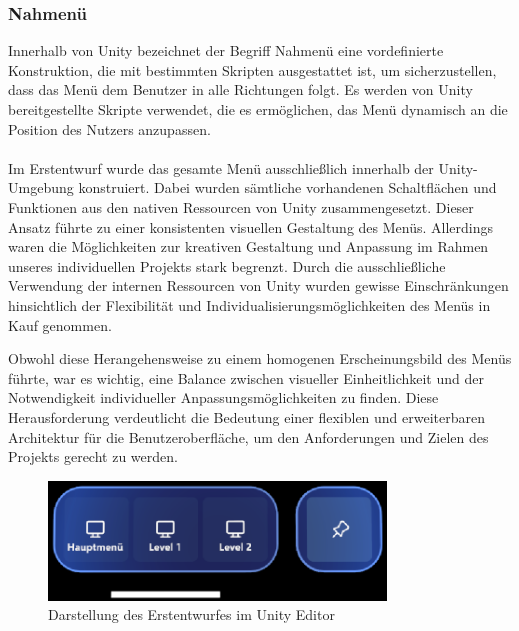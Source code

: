 \subsubsection*{Nahmenü}
Innerhalb von Unity bezeichnet der Begriff Nahmenü eine vordefinierte Konstruktion, die mit bestimmten Skripten
ausgestattet ist, um sicherzustellen, dass das Menü dem Benutzer in alle Richtungen folgt. Es werden von Unity
bereitgestellte Skripte verwendet, die es ermöglichen, das Menü dynamisch an die Position des Nutzers anzupassen.\\
\\
Im Erstentwurf wurde das gesamte Menü ausschließlich innerhalb der Unity-Umgebung konstruiert. Dabei wurden sämtliche
vorhandenen Schaltflächen und Funktionen aus den nativen Ressourcen von Unity zusammengesetzt. Dieser Ansatz führte zu
einer konsistenten visuellen Gestaltung des Menüs. Allerdings waren die Möglichkeiten zur kreativen Gestaltung und
Anpassung im Rahmen unseres individuellen Projekts stark begrenzt. Durch die ausschließliche Verwendung der internen
Ressourcen von Unity wurden gewisse Einschränkungen hinsichtlich der Flexibilität und Individualisierungsmöglichkeiten
des Menüs in Kauf genommen.

Obwohl diese Herangehensweise zu einem homogenen Erscheinungsbild des Menüs führte, war es wichtig, eine Balance
zwischen visueller Einheitlichkeit und der Notwendigkeit individueller Anpassungsmöglichkeiten zu finden. Diese
Herausforderung verdeutlicht die Bedeutung einer flexiblen und erweiterbaren Architektur für die Benutzeroberfläche,
um den Anforderungen und Zielen des Projekts gerecht zu werden.
\begin{figure}[H]
    \centering
    \includegraphics[width=0.8\textwidth]{images/menubarversion1.png}
    \caption{Darstellung des Erstentwurfes im Unity Editor}
    \label{fig:menübar}
\end{figure}

